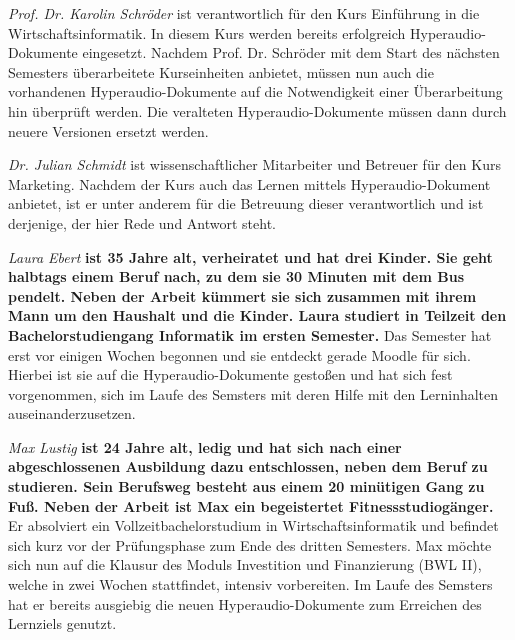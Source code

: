 \par
\begingroup
\leftskip=1cm
\rightskip=1.5cm
\noindent

{\Large\emph{Prof. Dr. Karolin Schröder}} ist verantwortlich für den Kurs \glqq Einführung in die Wirtschaftsinformatik\grqq{}. In diesem Kurs werden bereits erfolgreich Hyperaudio-Dokumente eingesetzt. Nachdem Prof. Dr. Schröder mit dem Start des nächsten Semesters überarbeitete Kurseinheiten anbietet, müssen nun auch die vorhandenen Hyperaudio-Dokumente auf die Notwendigkeit einer Überarbeitung hin überprüft werden. Die veralteten Hyperaudio-Dokumente müssen dann durch neuere Versionen ersetzt werden.
\vspace{.5cm}

{\Large\emph{Dr. Julian Schmidt}} ist wissenschaftlicher Mitarbeiter und Betreuer für den Kurs \glqq Marketing\grqq{}. Nachdem der Kurs auch das Lernen mittels Hyperaudio-Dokument anbietet, ist er unter anderem für die Betreuung dieser verantwortlich und ist derjenige, der hier Rede und Antwort steht.
\vspace{.5cm}

{\Large\emph{Laura Ebert}} \textbf{ist 35 Jahre alt, verheiratet und hat drei Kinder. Sie geht halbtags einem Beruf nach, zu dem sie 30 Minuten mit dem Bus pendelt. Neben der Arbeit kümmert sie sich zusammen mit ihrem Mann um den Haushalt und die Kinder. Laura studiert in Teilzeit den Bachelorstudiengang Informatik im ersten Semester.} Das Semester hat erst vor einigen Wochen begonnen und sie entdeckt gerade Moodle für sich. Hierbei ist sie auf die Hyperaudio-Dokumente gestoßen und hat sich fest vorgenommen, sich im Laufe des Semsters mit deren Hilfe mit den Lerninhalten auseinanderzusetzen.
\vspace{.5cm}
 
{\Large\emph{Max Lustig}} \textbf{ist 24 Jahre alt, ledig und hat sich nach einer abgeschlossenen Ausbildung dazu entschlossen, neben dem Beruf zu studieren. Sein Berufsweg besteht aus einem 20 minütigen Gang zu Fuß. Neben der Arbeit ist Max ein begeistertet Fitnessstudiogänger.} Er absolviert ein Vollzeitbachelorstudium in Wirtschaftsinformatik und befindet sich kurz vor der Prüfungsphase zum Ende des dritten Semesters. Max möchte sich nun auf die Klausur des Moduls \glqq Investition und Finanzierung (BWL II)\grqq{}, welche in zwei Wochen stattfindet, intensiv vorbereiten. Im Laufe des Semsters hat er bereits ausgiebig die neuen Hyperaudio-Dokumente zum Erreichen des Lernziels genutzt.

\par
\endgroup

